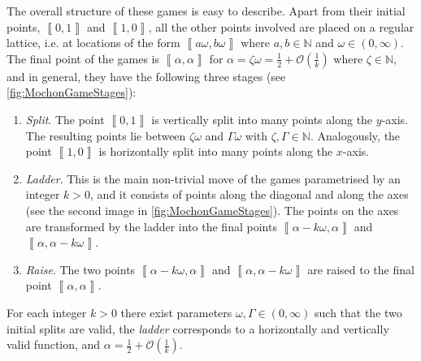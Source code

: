 \documentclass{article}
\begin{document}
%
%
%
%
%
%
%
%
%
%
%
%
%
%
%
%
%
%
%
%
The overall structure of these games is easy to describe. Apart from their initial points, $\left\llbracket 0,1\right\rrbracket $
and $\left\llbracket 1,0\right\rrbracket $, all the other points involved are placed on a regular lattice, i.e. at locations of the form $\left\llbracket a\omega,b\omega\right\rrbracket $
where $a,b\in\mathbb{N}$ and $\omega\in (0,\infty)$. The final point of the games is $\left\llbracket \alpha,\alpha\right\rrbracket $
for $\alpha=\zeta\omega=\frac{1}{2}+\mathcal{O}\left(\frac{1}{k}\right)$
where $\zeta\in\mathbb{N}$, and in general, they have the following three stages (see
 \cref{fig:MochonGameStages}):
\begin{enumerate}
  \item \emph{Split}. The point $\left\llbracket 0,1\right\rrbracket $ is
        vertically split into many points along the $y$-axis. The resulting
        points lie between $\zeta\omega$ and $\Gamma\omega$ with $\zeta,\Gamma\in \mathbb{N}$. Analogously, the point $\left\llbracket 1,0\right\rrbracket $
        is horizontally split into many points along the $x$-axis.
  \item \emph{Ladder}. This is the main non-trivial move of the games parametrised by an integer $k>0$, and it consists of points along the diagonal
        and along the axes (see the second image in  \cref{fig:MochonGameStages}). The points on the axes are transformed by the
        ladder into the final points $\left\llbracket \alpha-k\omega,\alpha\right\rrbracket $
        and $\left\llbracket \alpha,\alpha-k\omega\right\rrbracket $.
  \item \emph{Raise}. The two points $\left\llbracket \alpha-k\omega,\alpha\right\rrbracket $
        and $\left\llbracket \alpha,\alpha-k\omega\right\rrbracket $ are
        raised to the final point $\left\llbracket \alpha,\alpha\right\rrbracket $.
\end{enumerate}
For each integer $k>0$ there exist parameters
$\omega,\Gamma\in (0,\infty)$ such that
the two initial splits are valid,  the \emph{ladder}
corresponds to a horizontally and vertically valid function,
and $\alpha=\frac{1}{2}+\mathcal{O}\left(\frac{1}{k}\right)$. %
\end{document}
